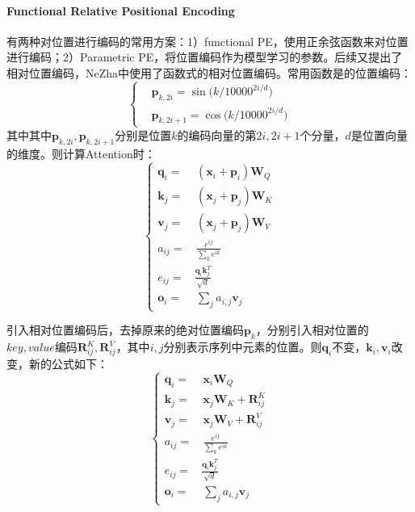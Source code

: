 \paragraph{Functional Relative Positional Encoding}有两种对位置进行编码的常用方案：1）functional PE，使用正余弦函数来对位置进行编码；2）Parametric PE，将位置编码作为模型学习的参数。后续又提出了相对位置编码，NeZha中使用了函数式的相对位置编码。常用函数是的位置编码：
$$
\begin{equation}\nonumber
	\left\{\begin{aligned}&\boldsymbol{p}_{k,2i}=\sin\Big(k/10000^{2i/d}\Big)\\ 
		&\boldsymbol{p}_{k, 2i+1}=\cos\Big(k/10000^{2i/d}\Big) 
	\end{aligned}\right.
\end{equation}
$$
其中其中$\boldsymbol{p}_{k,2i}, \boldsymbol{p}_{k,2i+1}$分别是位置$k$的编码向量的第$2i, 2i+1$个分量，$d$是位置向量的维度。则计算Attention时：
$$
\begin{equation}\nonumber
	\left\{
	\begin{aligned} 
		\boldsymbol{q}_i =&\, (\boldsymbol{x}_i + \boldsymbol{p}_i)\boldsymbol{W}_Q \\ 
		\boldsymbol{k}_j =&\, (\boldsymbol{x}_j + \boldsymbol{p}_j)\boldsymbol{W}_K \\ 
		\boldsymbol{v}_j =&\, (\boldsymbol{x}_j + \boldsymbol{p}_j)\boldsymbol{W}_V \\ 
		a_{ij} =&\, \frac{e^{ij}}{\sum_k e^{ik}}\\ 
		e_{ij} =& \frac{\boldsymbol{q}_i \boldsymbol{k}_j^T}{\sqrt{d}}\\
		\boldsymbol{o}_i =&\, \sum_j a_{i,j}\boldsymbol{v}_j 
	\end{aligned}\right.
\end{equation}
$$

引入相对位置编码后，去掉原来的绝对位置编码$\boldsymbol{p}_k$，分别引入相对位置的$key, value$编码$\boldsymbol{R}_{ij}^K, \boldsymbol{R}_{ij}^V$，其中$i, j$分别表示序列中元素的位置。则$\boldsymbol{q}_i$不变，$\boldsymbol{k}_i, \boldsymbol{v}_i$改变，新的公式如下：
$$
\begin{equation}\nonumber
	\left\{
	\begin{aligned} 
		\boldsymbol{q}_i =&\, \boldsymbol{x}_i \boldsymbol{W}_Q \\ 
		\boldsymbol{k}_j =&\, \boldsymbol{x}_j \boldsymbol{W}_K + \boldsymbol{R}_{ij}^K \\ 
		\boldsymbol{v}_j =&\, \boldsymbol{x}_j \boldsymbol{W}_V + \boldsymbol{R}_{ij}^V \\ 
		a_{ij} =&\, \frac{e^{ij}}{\sum_k e^{ik}}\\ 
		e_{ij} =& \frac{\boldsymbol{q}_i \boldsymbol{k}_j^T}{\sqrt{d}}\\
		\boldsymbol{o}_i =&\, \sum_j a_{i,j}\boldsymbol{v}_j 
	\end{aligned}\right.
\end{equation}
$$

